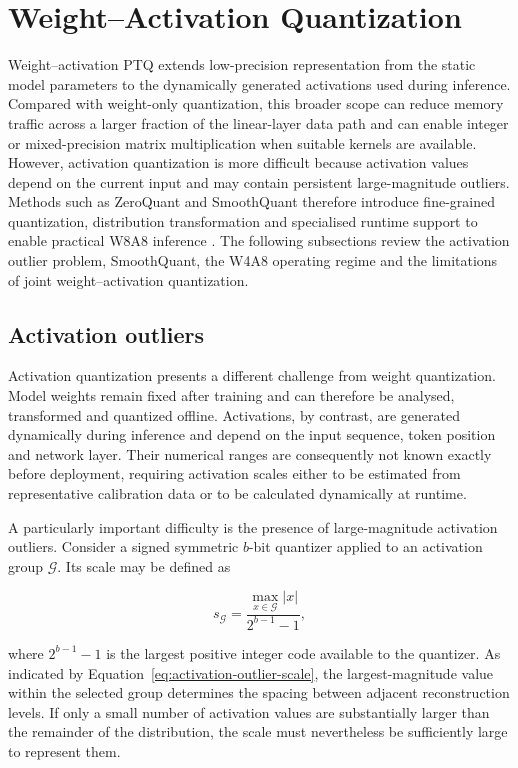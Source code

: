 \section{Weight–Activation Quantization}

Weight--activation \ac{PTQ} extends low-precision representation from
the static model parameters to the dynamically generated activations
used during inference. Compared with weight-only quantization, this
broader scope can reduce memory traffic across a larger fraction of the
linear-layer data path and can enable integer or mixed-precision matrix
multiplication when suitable kernels are available. However, activation
quantization is more difficult because activation values depend on the
current input and may contain persistent large-magnitude outliers.
Methods such as ZeroQuant and SmoothQuant therefore introduce
fine-grained quantization, distribution transformation and specialised
runtime support to enable practical W8A8 inference
\cite{yao2022zeroquantefficientaffordableposttraining,
xiao2023smoothquant}. The following subsections review the activation
outlier problem, SmoothQuant, the W4A8 operating regime and the
limitations of joint weight--activation quantization.

\subsection{Activation outliers}
Activation quantization presents a different challenge from weight
quantization. Model weights remain fixed after training and can
therefore be analysed, transformed and quantized offline. Activations,
by contrast, are generated dynamically during inference and depend on
the input sequence, token position and network layer. Their numerical
ranges are consequently not known exactly before deployment, requiring
activation scales either to be estimated from representative calibration
data or to be calculated dynamically at runtime.

A particularly important difficulty is the presence of
large-magnitude activation outliers. Consider a signed symmetric
\(b\)-bit quantizer applied to an activation group
\(\mathcal{G}\). Its scale may be defined as

\begin{equation}
s_{\mathcal{G}}
=
\frac{
\displaystyle\max_{x\in\mathcal{G}} |x|
}{
2^{b-1}-1
},
\label{eq:activation-outlier-scale}
\end{equation}

where \(2^{b-1}-1\) is the largest positive integer code available to
the quantizer. As indicated by
Equation~\eqref{eq:activation-outlier-scale}, the largest-magnitude
value within the selected group determines the spacing between adjacent
reconstruction levels. If only a small number of activation values are
substantially larger than the remainder of the distribution, the scale
must nevertheless be sufficiently large to represent them.

